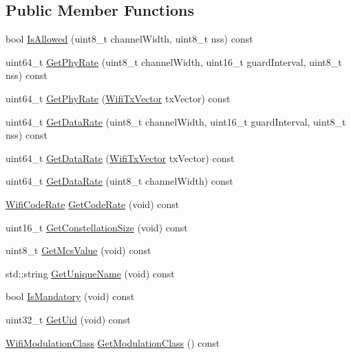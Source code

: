 \subsection*{Public Member Functions}
\begin{DoxyCompactItemize}
\item 
bool \hyperlink{classns3_1_1WifiMode_a996eeb87ea67b483f0c1915780012e86}{Is\+Allowed} (uint8\+\_\+t channel\+Width, uint8\+\_\+t nss) const 
\item 
uint64\+\_\+t \hyperlink{classns3_1_1WifiMode_aadbe7aaee8542a7e9b79a64f6960cde6}{Get\+Phy\+Rate} (uint8\+\_\+t channel\+Width, uint16\+\_\+t guard\+Interval, uint8\+\_\+t nss) const 
\item 
uint64\+\_\+t \hyperlink{classns3_1_1WifiMode_a881692c8c9723362727ef83435308014}{Get\+Phy\+Rate} (\hyperlink{classns3_1_1WifiTxVector}{Wifi\+Tx\+Vector} tx\+Vector) const 
\item 
uint64\+\_\+t \hyperlink{classns3_1_1WifiMode_adcfbe150f69da720db23387f733b8a52}{Get\+Data\+Rate} (uint8\+\_\+t channel\+Width, uint16\+\_\+t guard\+Interval, uint8\+\_\+t nss) const 
\item 
uint64\+\_\+t \hyperlink{classns3_1_1WifiMode_a89ac721c78638d325287b91808dafa81}{Get\+Data\+Rate} (\hyperlink{classns3_1_1WifiTxVector}{Wifi\+Tx\+Vector} tx\+Vector) const 
\item 
uint64\+\_\+t \hyperlink{classns3_1_1WifiMode_a00239449d2103610d8bd06d60e33806f}{Get\+Data\+Rate} (uint8\+\_\+t channel\+Width) const 
\item 
\hyperlink{namespacens3_aeaf3a86fd4bdb7829955238fba43e2ad}{Wifi\+Code\+Rate} \hyperlink{classns3_1_1WifiMode_a41fcb1abd2aa488145f2f43ca9ba8e1d}{Get\+Code\+Rate} (void) const 
\item 
uint16\+\_\+t \hyperlink{classns3_1_1WifiMode_a28bbc436203fd3332da6cc61909af8f1}{Get\+Constellation\+Size} (void) const 
\item 
uint8\+\_\+t \hyperlink{classns3_1_1WifiMode_acd40f9e0edfc1e2c4462bd016a08f160}{Get\+Mcs\+Value} (void) const 
\item 
std\+::string \hyperlink{classns3_1_1WifiMode_a18e0a33034f484d3ca8c0497d3ea1dc7}{Get\+Unique\+Name} (void) const 
\item 
bool \hyperlink{classns3_1_1WifiMode_ad7db9c41e193eb656c8dc66ec68cf0d0}{Is\+Mandatory} (void) const 
\item 
uint32\+\_\+t \hyperlink{classns3_1_1WifiMode_a430e2531c5ed9a955bf8511f9ad61df5}{Get\+Uid} (void) const 
\item 
\hyperlink{namespacens3_aa999e1221606a2b21b1eb33c2007c217}{Wifi\+Modulation\+Class} \hyperlink{classns3_1_1WifiMode_a7941cd2a0bc8d2ba68ba6a12c7e2c42a}{Get\+Modulation\+Class} () const 

\end{DoxyCompactItemize}
